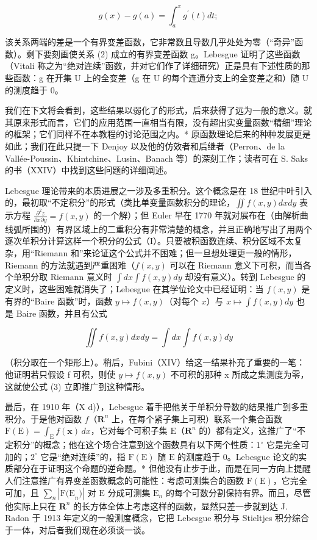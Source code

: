 \[
g (x) - g (a) = \int_ {a} ^ {x} g ^ {\prime} (t) d t;\tag{2}
\]

该关系两端的差是一个有界变差函数，它非常数且导数几乎处处为零（“奇异”函数）。剩下要刻画使关系 (2) 成立的有界变差函数 g。Lebesgue 证明了这些函数（Vitali 称之为“绝对连续”函数，并对它们作了详细研究）正是具有下述性质的那些函数：g 在开集 U 上的全变差（g 在 U 的每个连通分支上的全变差之和）随 U 的测度趋于 0。

我们在下文将会看到，这些结果以弱化了的形式，后来获得了远为一般的意义。就其原来形式而言，它们的应用范围一直相当有限，没有超出实变量函数“精细”理论的框架；它们同样不在本教程的讨论范围之内。* 原函数理论后来的种种发展更是如此；我们在此只提一下 Denjoy 以及他的仿效者和后继者（Perron、de la Vallée-Poussin、Khintchine、Lusin、Banach 等）的深刻工作；读者可在 S. Saks 的书（XXIV）中找到这些问题的详细阐述。

Lebesgue 理论带来的本质进展之一涉及多重积分。这个概念是在 18 世纪中叶引入的，最初取“不定积分”的形式（类比单变量函数积分的理论，\(\iint f(x,y) dx dy\) 表示方程 \(\frac{\partial^2 z}{\partial x \partial y} = f(x,y)\) 的一个解）；但 Euler 早在 1770 年就对展布在（由解析曲线弧所围的）有界区域上的二重积分有非常清楚的概念，并且正确地写出了用两个逐次单积分计算这样一个积分的公式（I）。只要被积函数连续、积分区域不太复杂，用“Riemann 和”来论证这个公式并不困难；但一旦想处理更一般的情形，Riemann 的方法就遇到严重困难（\(f(x,y)\) 可以在 Riemann 意义下可积，而当各个单积分取 Riemann 意义时 \(\int dx \int f(x,y) dy\) 却没有意义）。转到 Lebesgue 的定义时，这些困难就消失了；Lebesgue 在其学位论文中已经证明：当 \(f(x,y)\) 是有界的“Baire 函数”时，函数 \(y \mapsto f(x,y)\)（对每个 \(x\)）与 \(x \mapsto \int f(x,y) dy\) 也是 Baire 函数，并且有公式

\[
\iint f (x, y) d x d y = \int d x \int f (x, y) d y\tag{3}
\]

（积分取在一个矩形上）。稍后，Fubini（XIV）给这一结果补充了重要的一笔：他证明若只假设 f 可积，则使 \(y \mapsto f(x, y)\) 不可积的那种 x 所成之集测度为零，这就使公式 (3) 立即推广到这种情形。

最后，在 1910 年（X d)），Lebesgue 着手把他关于单积分导数的结果推广到多重积分。于是他对函数 \(f\)（\(\mathbf{R}^n\) 上，在每个紧子集上可积）联系一个集合函数 \(\mathrm{F(E)} = \int_{\mathrm{E}} f(\mathbf{x}) \, dx\)，它对每个可积子集 \(\mathrm{E}\)（\(\mathbf{R}^n\) 的）都有定义，这推广了“不定积分”的概念；他在这个场合注意到这个函数具有以下两个性质：\(1^\circ\) 它是完全可加的；\(2^\circ\) 它是“绝对连续”的，指 \(\mathrm{F(E)}\) 随 \(\mathrm{E}\) 的测度趋于 0。Lebesgue 论文的实质部分在于证明这个命题的逆命题。* 但他没有止步于此，而是在同一方向上提醒人们注意推广有界变差函数概念的可能性：考虑可测集合的函数 \(\mathrm{F(E)}\)，它完全可加，且 \(\sum_{n} |\mathrm{F(E}_{n})|\) 对 \(\mathrm{E}\) 分成可测集 \(\mathrm{E}_{n}\) 的每个可数分割保持有界。而且，尽管他实际上只在 \(\mathbf{R}^n\) 的长方体全体上考虑这样的函数，显然只差一步就到达 J. Radon 于 1913 年定义的一般测度概念，它把 Lebesgue 积分与 Stieltjes 积分综合于一体，对后者我们现在必须谈一谈。

